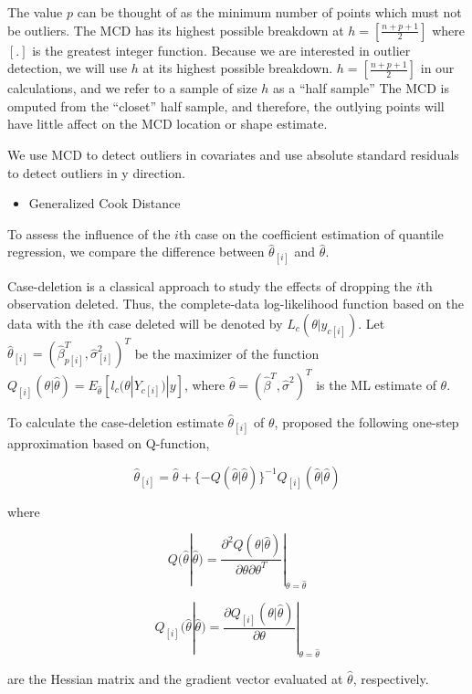 \documentclass[11pt,a4paper,]{article}
\providecommand{\tightlist}{%
  \setlength{\itemsep}{0pt}\setlength{\parskip}{0pt}}
\theoremstyle{definition}
\theoremstyle{definition}
\theoremstyle{remark}
\begin{document}
The value \(p\) can be thought of as the minimum number of points which
must not be outliers. The MCD has its highest possible breakdown at
\(h=[\frac{n+p+1}{2}]\) where \([.]\) is the greatest integer function.
Because we are interested in outlier detection, we will use \(h\) at its
highest possible breakdown. \(h=[\frac{n+p+1}{2}]\) in our calculations,
and we refer to a sample of size \(h\) as a ``half sample'' The MCD is
omputed from the ``closet'' half sample, and therefore, the outlying
points will have little affect on the MCD location or shape estimate.

We use MCD to detect outliers in covariates and use absolute standard
residuals to detect outliers in y direction.

\begin{itemize}
\tightlist
\item
  Generalized Cook Distance
\end{itemize}

To assess the influence of the \(i\)th case on the coefficient
estimation of quantile regression, we compare the difference between
\(\hat{\theta}_{[i]}\) and \(\hat{\theta}\).

Case-deletion is a classical approach to study the effects of dropping
the \(i\)th observation deleted. Thus, the complete-data log-likelihood
function based on the data with the \(i\)th case deleted will be denoted
by \(L_{c}(\theta|y_{c[i]})\). Let
\(\hat{\theta}_{[i]}=(\hat{\beta}^{T}_{p[i]}, \hat{\sigma}^{2}_{[i]})^{T}\)
be the maximizer of the function
\(Q_{[i]}(\theta|\hat{\theta})=E_{\hat{\theta}}[l_{c}(\theta|Y_{c[i]})|y]\),
where \(\hat{\theta}=(\hat{\beta}^{T}, \hat{\sigma}^{2})^{T}\) is the ML
estimate of \(\theta\).

To calculate the case-deletion estimate \(\hat{\theta}_{[i]}\) of
\(\theta\), proposed the following one-step approximation based on
Q-function,

\[\hat{\theta}_{[i]}=\hat{\theta}+\{-Q(\hat{\theta}|\hat{\theta})\}^{-1}Q_{[i]}(\hat{\theta}|\hat{\theta})\]

where

\[Q(\hat{\theta}|\hat{\theta})=\frac{\partial^{2}Q(\theta|\hat{\theta})}{\partial\theta\partial \theta^{T}}|_{\theta=\hat{\theta}}\]

\[Q_{[i]}(\hat{\theta}|\hat{\theta})=\frac{\partial Q_{[i]}(\theta|\hat{\theta})}{\partial\theta}|_{\theta=\hat{\theta}}\]

are the Hessian matrix and the gradient vector evaluated at
\(\hat{\theta}\), respectively.
\end{document}
